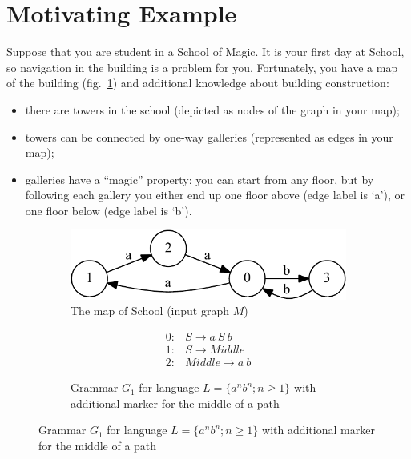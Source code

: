 \section{Motivating Example}\label{motivExample}

Suppose that you are student in a School of Magic.
It is your first day at School, so navigation in the building is a problem for you.
Fortunately, you have a map of the building (fig.~\ref{input}) and additional knowledge about building construction:
\begin{itemize}
  \item there are towers in the school (depicted as nodes of the graph in your map);
  \item towers can be connected by one-way galleries (represented as edges in your map);
  \item galleries have a ``magic'' property: you can start from any floor, but by following each gallery you either end up one floor above (edge label is `a'), or one floor below (edge label is `b'). 
\end{itemize}

\begin{figure}[h]
    \begin{center}
	\centering
    \begin{subfigure}[b]{0.45\textwidth}
        \includegraphics[width=\textwidth]{dot/input.pdf}
        \caption{The map of School (input graph $M$)}
        \label{input}        
	\end{subfigure}
	\vspace{1em}
	\begin{subfigure}[b]{0.45\textwidth}
   \[
\begin{array}{rl}
   0:& S \rightarrow a \ S \ b \\
   1:& S \rightarrow Middle \\
   2:& Middle \rightarrow a \ b
\end{array}
\]
   \caption{Grammar $G_1$ for language $L=\{a^n b^n; n \geq 1\}$ with additional marker for the middle of a path}
   \label{grammarG}        
	\end{subfigure}
    \end{center}
\end{figure}


